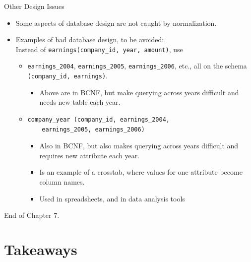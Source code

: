 \documentclass[aspectratio=169]{beamer}
\begin{document}
\begin{frame}[fragile]{Other Design Issues}
    \begin{itemize}
        \item Some aspects of database design are not caught by normalization.
        \item Examples of bad database design, to be avoided:\\
            Instead of \verb|earnings(company_id, year, amount)|, use
            \begin{itemize}
                \item \verb|earnings_2004|, \verb|earnings_2005|, \verb|earnings_2006|, etc., all on the schema \verb|(company_id, earnings)|.
                    \begin{itemize}
                        \item Above are in BCNF, but make querying across years difficult and needs new table each year.
                    \end{itemize}
                \item
                    \begin{verbatim}
company_year (company_id, earnings_2004,
    earnings_2005, earnings_2006)
                    \end{verbatim}
                    \vspace{-3mm}

                    \begin{itemize}
                        \item Also in BCNF, but also makes querying across years difficult and requires new attribute each year.
                        \item Is an example of a crosstab, where values for one attribute become column names.
                        \item Used in spreadsheets, and in data analysis tools
                    \end{itemize}
            \end{itemize}
    \end{itemize}
\end{frame}

\begin{frame}{}
     \centering
     \Huge End of Chapter 7.
\end{frame}

\section*{Takeaways}
\end{document}
